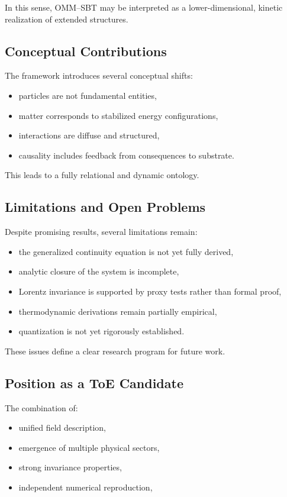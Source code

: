 \documentclass[11pt]{article}
\begin{document}
In this sense, OMM--SBT may be interpreted as a lower-dimensional, kinetic realization of extended structures.

\subsection{Conceptual Contributions}

The framework introduces several conceptual shifts:

\begin{itemize}
\item particles are not fundamental entities,
\item matter corresponds to stabilized energy configurations,
\item interactions are diffuse and structured,
\item causality includes feedback from consequences to substrate.
\end{itemize}

This leads to a fully relational and dynamic ontology.

\subsection{Limitations and Open Problems}

Despite promising results, several limitations remain:

\begin{itemize}
\item the generalized continuity equation is not yet fully derived,
\item analytic closure of the system is incomplete,
\item Lorentz invariance is supported by proxy tests rather than formal proof,
\item thermodynamic derivations remain partially empirical,
\item quantization is not yet rigorously established.
\end{itemize}

These issues define a clear research program for future work.

\subsection{Position as a ToE Candidate}

The combination of:

\begin{itemize}
\item unified field description,
\item emergence of multiple physical sectors,
\item strong invariance properties,
\item independent numerical reproduction,
\end{itemize}
\end{document}
